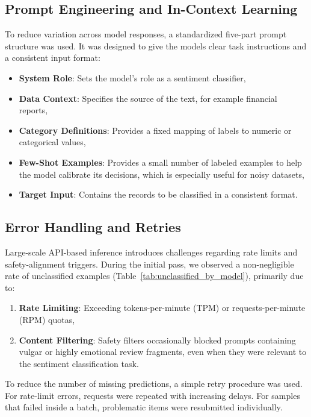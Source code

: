 \documentclass[conference]{IEEEtran}
\begin{document}
\subsection{Prompt Engineering and In-Context Learning}
To reduce variation across model responses, a standardized five-part prompt structure was used. It was designed to give the models clear task instructions and a consistent input format:
\begin{itemize}
\item \textbf{System Role}: Sets the model's role as a sentiment classifier,
\item \textbf{Data Context}: Specifies the source of the text, for example financial reports,
\item \textbf{Category Definitions}: Provides a fixed mapping of labels to numeric or categorical values,
\item \textbf{Few-Shot Examples}: Provides a small number of labeled examples to help the model calibrate its decisions, which is especially useful for noisy datasets,
\item \textbf{Target Input}: Contains the records to be classified in a consistent format.
\end{itemize}

\vspace{-0.6em}

\subsection{Error Handling and Retries}
Large-scale API-based inference introduces challenges regarding rate limits and safety-alignment triggers. During the initial pass, we observed a non-negligible rate of unclassified examples (Table~\ref{tab:unclassified_by_model}), primarily due to:
\begin{enumerate}
    \item \textbf{Rate Limiting}: Exceeding tokens-per-minute (TPM) or requests-per-minute (RPM) quotas,
    \item \textbf{Content Filtering}: Safety filters occasionally blocked prompts containing vulgar or highly emotional review fragments, even when they were relevant to the sentiment classification task.
\end{enumerate}

To reduce the number of missing predictions, a simple retry procedure was used. For rate-limit errors, requests were repeated with increasing delays. For samples that failed inside a batch, problematic items were resubmitted individually. 
\end{document}

